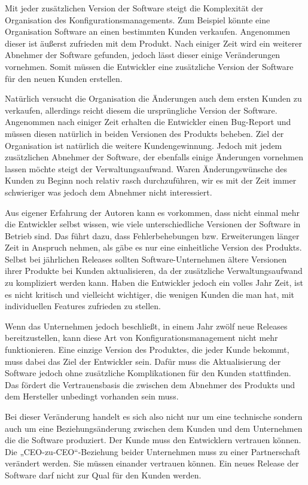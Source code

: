 Mit jeder zusätzlichen Version der Software steigt die Komplexität der Organisation des Konfigurationsmanagements. Zum Beispiel könnte eine Organisation Software an einen bestimmten Kunden verkaufen. Angenommen dieser ist äußerst zufrieden mit dem Produkt. Nach einiger Zeit wird ein weiterer Abnehmer der Software gefunden,  jedoch lässt dieser einige Veränderungen vornehmen. Somit müssen die Entwickler eine zusätzliche Version der Software für den neuen Kunden erstellen. 

Natürlich versucht die Organisation die Änderungen auch dem ersten Kunden zu verkaufen, allerdings reicht diesem die ursprüngliche Version der Software. Angenommen nach einiger Zeit erhalten die Entwickler einen Bug-Report und müssen diesen natürlich in beiden Versionen des Produkts beheben. Ziel der Organisation ist natürlich die weitere Kundengewinnung. Jedoch mit jedem zusätzlichen Abnehmer der Software, der ebenfalls einige Änderungen vornehmen lassen möchte steigt der Verwaltungsaufwand. Waren Änderungswünsche des Kunden zu Beginn noch relativ rasch durchzuführen, wir es mit der Zeit immer schwieriger was jedoch dem Abnehmer nicht interessiert.

Aus eigener Erfahrung der Autoren kann es vorkommen, dass nicht einmal mehr die Entwickler selbst wissen, wie viele unterschiedliche Versionen der Software in Betrieb sind. Das führt dazu, dass Fehlerbehebungen bzw. Erweiterungen länger Zeit in Anspruch nehmen, als gäbe es nur eine einheitliche Version des Produkts. Selbst bei jährlichen Releases sollten Software-Unternehmen ältere Versionen ihrer Produkte bei Kunden aktualisieren, da der zusätzliche Verwaltungsaufwand zu kompliziert werden kann. Haben die Entwickler jedoch ein volles Jahr Zeit, ist es nicht kritisch und vielleicht wichtiger, die wenigen Kunden die man hat, mit individuellen Features zufrieden zu stellen.

Wenn das Unternehmen jedoch beschließt, in einem Jahr zwölf neue Releases bereitzustellen, kann diese Art von Konfigurationsmanagement nicht mehr funktionieren. Eine einzige Version des Produktes, die jeder Kunde bekommt, muss dabei das Ziel der Entwickler sein. Dafür muss die Aktualisierung der Software jedoch ohne zusätzliche Komplikationen für den Kunden stattfinden. Das fördert die Vertrauensbasis die zwischen dem Abnehmer des Produkts und dem Hersteller unbedingt vorhanden sein muss.

Bei dieser Veränderung handelt es sich also nicht nur um eine technische sondern auch um eine Beziehungsänderung zwischen dem Kunden und dem Unternehmen die die Software produziert. Der Kunde muss den Entwicklern vertrauen können. Die „CEO-zu-CEO“-Beziehung beider Unternehmen muss zu einer Partnerschaft verändert werden. Sie müssen einander vertrauen können. Ein neues Release der Software darf nicht zur Qual für den Kunden werden. 

